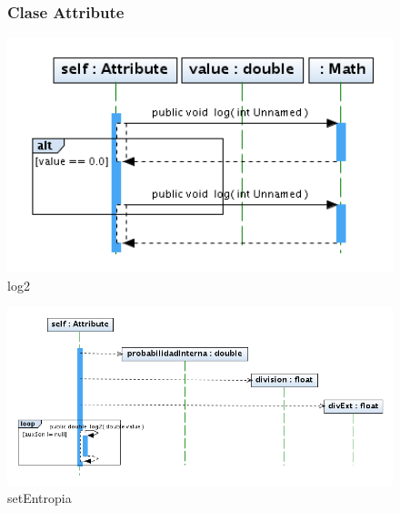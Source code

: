 \begin{figure}
\subsubsection{Clase Attribute}
\centering
\includegraphics[width=1\textwidth]{imgsSecuencia/Attribute/log2.png}
\caption{log2}
\end{figure}
\newpage
\begin{figure}
\centering
\includegraphics[width=1.2\textwidth]{imgsSecuencia/Attribute/setEntropia.png}
\caption{setEntropia}
\end{figure}
\newpage



